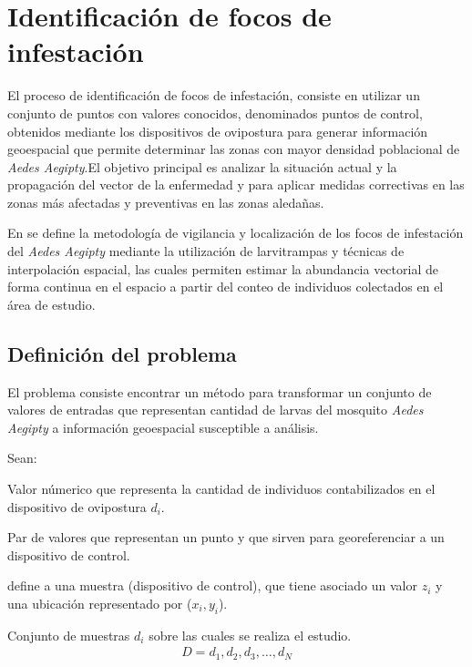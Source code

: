 \section{Identificación de focos de infestación}

El proceso de identificación de focos de infestación, consiste en utilizar un conjunto de puntos con valores
conocidos, denominados puntos de control, obtenidos mediante los dispositivos  de ovipostura para generar
información geoespacial que permite determinar las zonas con mayor densidad poblacional de \textit{Aedes Aegipty}.El
objetivo principal es analizar la situación actual y la propagación del vector de la enfermedad y para aplicar
medidas correctivas en las zonas más afectadas y preventivas en las zonas aledañas.

En \cite{NINO2011} se define la metodología de vigilancia y localización de los focos de infestación del 
\textit{Aedes Aegipty} mediante la utilización de larvitrampas y técnicas de interpolación espacial, las 
cuales permiten estimar la abundancia vectorial de forma continua en el espacio a partir del conteo de individuos
colectados en el área de estudio. 

\subsection{Definición del problema}
El problema consiste encontrar un método para transformar un conjunto de valores de entradas que representan cantidad de larvas del mosquito \textit{Aedes Aegipty} a información geoespacial susceptible a análisis.

Sean:
\begin{description}[style=multiline,leftmargin=1.5cm]
    \item[$z_{i}$] Valor númerico que representa la cantidad de individuos contabilizados en el dispositivo de ovipostura $d_{i}$.
    
    \item[($x_{i},y_{i}$)] Par de valores que representan un punto y que sirven para georeferenciar a un dispositivo de control.  
    
    \item[$d_{i}$] define a una muestra (dispositivo de control), que tiene asociado un valor $z_{i}$ y una ubicación representado por ($x_{i},y_{i}$).

    \item[$D$] Conjunto de muestras $d_{i}$ sobre las cuales se realiza el estudio.
        \begin{align*}
            D = d_1,d_2,d_3,\ldots,d_N
        \end{align*}

\end{description}

